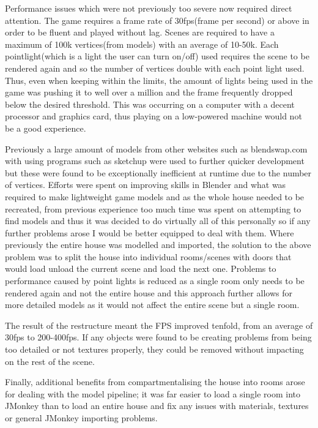 \documentclass[11pt]{report}
\begin{document}
Performance issues which were not previously too severe now required direct attention. The game requires a frame rate of 30fps(frame per second) or above in order to be fluent and played without lag. Scenes are required to have a maximum of 100k vertices(from models) with an average of 10-50k. Each pointlight(which is a light the user can turn on/off) used requires the scene to be rendered again and so the number of vertices double with each point light used. Thus, even when keeping within the limits, the amount of lights being used in the game was pushing it to well over a million and the frame frequently dropped below the desired threshold. This was occurring on a computer with a decent processor and graphics card, thus playing on a low-powered machine would not be a good experience.  

Previously a large amount of models from other websites such as blendswap.com with using programs such as sketchup were used to further quicker development but these were found to be exceptionally inefficient at runtime due to the number of vertices. Efforts were spent on improving skills in Blender and what was required to make lightweight game models and as the whole house needed to be recreated, from previous experience too much time was spent on attempting to find models and thus it was decided to do virtually all of this personally so if any further problems arose I would be better equipped to deal with them. Where previously the entire house was modelled and imported, the solution to the above problem was to split the house into individual rooms/scenes with doors that would load unload the current scene and load the next one. Problems to performance caused by point lights is reduced as a single room only needs to be rendered again and not the entire house and this approach further allows for more detailed models as it would not affect the entire scene but a single room.  

The result of the restructure meant the FPS improved tenfold, from an average of 30fps to 200-400fps. If any objects were found to be creating problems from being too detailed or not textures properly, they could be removed without impacting on the rest of the scene.

Finally, additional benefits from compartmentalising the house into rooms arose for dealing with the model pipeline; it was far easier to load a single room into JMonkey than to load an entire house and fix any issues with materials, textures or general JMonkey importing problems.
\end{document}
